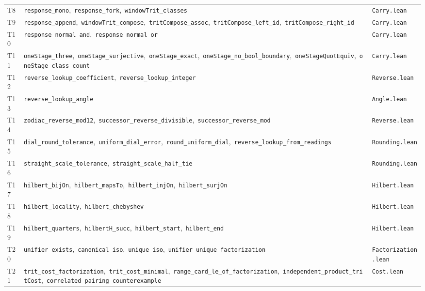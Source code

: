 \documentclass[11pt,a4paper]{article}
\theoremstyle{definition}
\begin{document}
{\begin{longtable}{@{}l>{\raggedright\arraybackslash}p{}l@{}}
T8 & \texttt{response\_mono},\allowbreak\ \texttt{response\_fork},\allowbreak\ \texttt{windowTrit\_classes} & \texttt{Carry.lean}\\
T9 & \texttt{response\_append},\allowbreak\ \texttt{windowTrit\_compose},\allowbreak\ \texttt{tritCompose\_assoc},\allowbreak\ \texttt{tritCompose\_left\_id},\allowbreak\ \texttt{tritCompose\_right\_id} & \texttt{Carry.lean}\\
T10 & \texttt{response\_normal\_and},\allowbreak\ \texttt{response\_normal\_or} & \texttt{Carry.lean}\\
T11 & \texttt{oneStage\_three},\allowbreak\ \texttt{oneStage\_surjective},\allowbreak\ \texttt{oneStage\_exact},\allowbreak\ \texttt{oneStage\_no\_bool\_boundary},\allowbreak\ \texttt{oneStageQuotEquiv},\allowbreak\ \texttt{oneStage\_class\_count} & \texttt{Carry.lean}\\
T12 & \texttt{reverse\_lookup\_coefficient},\allowbreak\ \texttt{reverse\_lookup\_integer} & \texttt{Reverse.lean}\\
T13 & \texttt{reverse\_lookup\_angle} & \texttt{Angle.lean}\\
T14 & \texttt{zodiac\_reverse\_mod12},\allowbreak\ \texttt{successor\_reverse\_divisible},\allowbreak\ \texttt{successor\_reverse\_mod} & \texttt{Reverse.lean}\\
T15 & \texttt{dial\_round\_tolerance},\allowbreak\ \texttt{uniform\_dial\_error},\allowbreak\ \texttt{round\_uniform\_dial},\allowbreak\ \texttt{reverse\_lookup\_from\_readings} & \texttt{Rounding.lean}\\
T16 & \texttt{straight\_scale\_tolerance},\allowbreak\ \texttt{straight\_scale\_half\_tie} & \texttt{Rounding.lean}\\
T17 & \texttt{hilbert\_bijOn},\allowbreak\ \texttt{hilbert\_mapsTo},\allowbreak\ \texttt{hilbert\_injOn},\allowbreak\ \texttt{hilbert\_surjOn} & \texttt{Hilbert.lean}\\
T18 & \texttt{hilbert\_locality},\allowbreak\ \texttt{hilbert\_chebyshev} & \texttt{Hilbert.lean}\\
T19 & \texttt{hilbert\_quarters},\allowbreak\ \texttt{hilbertH\_succ},\allowbreak\ \texttt{hilbert\_start},\allowbreak\ \texttt{hilbert\_end} & \texttt{Hilbert.lean}\\
T20 & \texttt{unifier\_exists},\allowbreak\ \texttt{canonical\_iso},\allowbreak\ \texttt{unique\_iso},\allowbreak\ \texttt{unifier\_unique\_factorization} & \texttt{Factorization.lean}\\
T21 & \texttt{trit\_cost\_factorization},\allowbreak\ \texttt{trit\_cost\_minimal},\allowbreak\ \texttt{range\_card\_le\_of\_factorization},\allowbreak\ \texttt{independent\_product\_tritCost},\allowbreak\ \texttt{correlated\_pairing\_counterexample} & \texttt{Cost.lean}\\

\end{longtable}}
\end{document}
